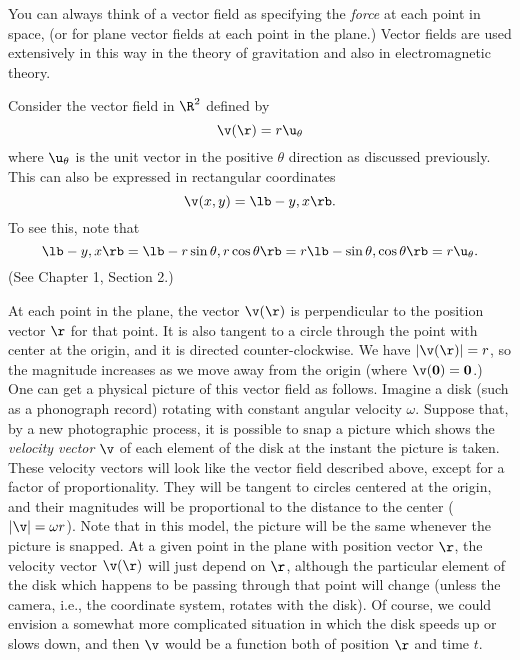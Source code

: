 You can always think of a vector field as specifying the
{\it force\/} at each point in space, (or for plane vector
fields at each point in the plane.)  Vector fields are used
extensively in this way in the theory of gravitation and also
in electromagnetic theory.

\nextex
{} Consider the vector field in $\R^2$  
defined by
$$
\v(\r) = r\u_\theta
$$
where  $\u_\theta$  is the unit vector in the positive $\theta$
direction as discussed previously.   This can also be expressed
in rectangular coordinates
$$
  \v(x,y) = \lb -y, x \rb.
$$
To see this, note that 
$$
\lb -y, x \rb = \lb -r\sin\theta, r\cos\theta \rb
= r\lb -\sin\theta, \cos\theta \rb = r\u_\theta.
$$
(See Chapter 1, Section 2.) 

At each point in the plane, the vector $\v(\r)$ is perpendicular
to the position vector $\r$ for that point.  It is also tangent to
a circle through the point with center at the origin, and it is
directed counter-clockwise.   We have
$|\v(\r)| = r$, so the magnitude increases as we move
away from the origin (where $\v(\bold 0) = \bold 0$.)  One
can get a physical picture of this vector field as follows.  
Imagine a disk (such as a phonograph record) rotating with
constant angular velocity $\omega$.   Suppose that, by a new photographic
process, it is possible to snap a picture 
which  shows the {\it
velocity vector\/}  $\v$  of each element of the disk
at the instant the picture is taken.   These velocity vectors
will look like the vector field described above, except for
a factor of proportionality.  They will
be tangent to circles centered at the origin, and their magnitudes
will be proportional to the distance to the center ($|\v| = \omega r$).   
Note that in this model, the picture will be the same whenever the
picture is snapped.  At a given point in the plane with
position vector $\r$, the
velocity vector $\v(\r)$ will just depend on $\r$, although the
particular element of the disk which happens to be passing through
that point will change (unless the camera, i.e., the coordinate
system, rotates with the disk).   Of course, we could envision a
somewhat more complicated situation in which the disk speeds up
or slows down, and then $\v$ would be a function both of position
$\r$ and time $t$.    
\endexample

